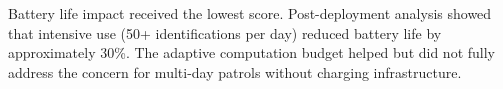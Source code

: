 Battery life impact received the lowest score.
Post-deployment analysis showed that intensive use (50+ identifications per day) reduced battery life by approximately 30\%.
The adaptive computation budget helped but did not fully address the concern for multi-day patrols without charging infrastructure.

